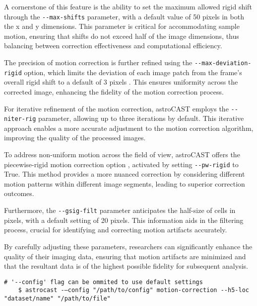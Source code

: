 A cornerstone of this feature is the ability to set the maximum allowed rigid shift through the \lstinline[style=
bashStyle]{--max-shifts} parameter, with a default value of 50 pixels in both the x and y dimensions. This parameter
is critical for accommodating sample motion, ensuring that shifts do not exceed half of the image dimensions, thus
balancing between correction effectiveness and computational efficiency.

The precision of motion correction is further refined using the \lstinline[style=bashStyle]{--max-deviation-rigid}
option, which limits the deviation of each image patch from the frame's overall rigid shift to a default of 3 pixels
. This ensures uniformity across the corrected image, enhancing the fidelity of the motion correction process.

For iterative refinement of the motion correction, astroCAST employs the \lstinline[style=bashStyle]{--niter-rig}
parameter, allowing up to three iterations by default. This iterative approach enables a more accurate adjustment to
the motion correction algorithm, improving the quality of the processed images.

To address non-uniform motion across the field of view, astroCAST offers the piecewise-rigid motion correction option
, activated by setting \lstinline[style=bashStyle]{--pw-rigid} to True. This method provides a more nuanced
correction by considering different motion patterns within different image segments, leading to superior correction
outcomes.

Furthermore, the \lstinline[style=bashStyle]{--gsig-filt} parameter anticipates the half-size of cells in pixels,
with a default setting of 20 pixels. This information aids in the filtering process, crucial for identifying and
correcting motion artifacts accurately.

By carefully adjusting these parameters, researchers can significantly enhance the quality of their imaging data,
ensuring that motion artifacts are minimized and that the resultant data is of the highest possible fidelity for
subsequent analysis.

\begin{lstlisting}[style=bashStyle]
    # '--config' flag can be ommited to use default settings
    $ astrocast -–config "/path/to/config" motion-correction --h5-loc "dataset/name" "/path/to/file"
\end{lstlisting}


